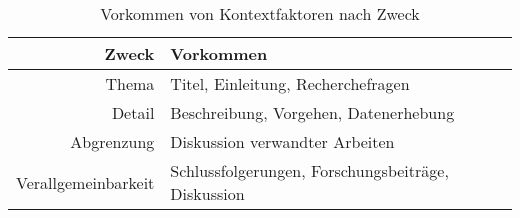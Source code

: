 \begin{table}[h!]
\begin{tabular}{ r | l }
 Zweck & Vorkommen \\
  \hline
  Thema & Titel, Einleitung, Recherchefragen \\
  Detail & Beschreibung, Vorgehen, Datenerhebung \\
  Abgrenzung & Diskussion verwandter Arbeiten \\
  Verallgemeinbarkeit & Schlussfolgerungen, Forschungsbeiträge, Diskussion \\
\end{tabular}
\caption{Vorkommen von Kontextfaktoren nach Zweck}
\label{table:vorkommen}
\end{table}
